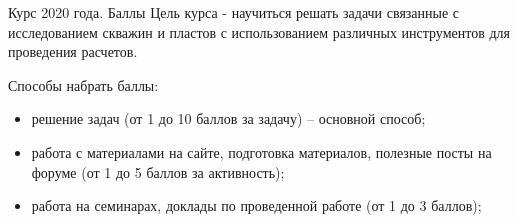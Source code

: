\begin{frame}{Курс 2020 года. Баллы}
Цель курса - научиться решать задачи связанные с исследованием скважин и пластов с использованием различных инструментов для проведения расчетов. 

Способы набрать баллы:
\begin{itemize}
    \item решение задач (от 1 до 10 баллов за задачу) -- основной способ;
    \item работа с материалами на сайте, подготовка материалов, полезные посты на форуме (от 1 до 5 баллов за активность);
    \item работа на семинарах, доклады по проведенной работе (от 1 до 3 баллов);    
\end{itemize}

\end{frame}
